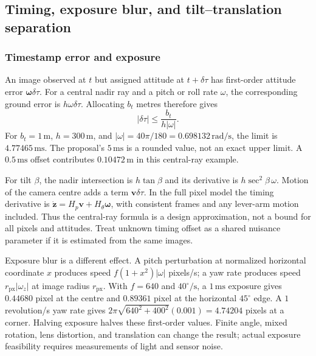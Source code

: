 \subsection{Timing, exposure blur, and tilt--translation separation}

\subsubsection{Timestamp error and exposure}

An image observed at $t$ but assigned attitude at $t+\delta\tau$ has
first-order attitude error $\boldsymbol\omega\delta\tau$. For a central
nadir ray and a pitch or roll rate $\omega$, the corresponding ground
error is $h\omega\delta\tau$. Allocating $b_t$ metres therefore gives
\begin{equation}
 |\delta\tau|\leq\frac{b_t}{h|\omega|}.
\end{equation}
For $b_t=1\,\mathrm m$, $h=300\,\mathrm m$, and
$|\omega|=40\pi/180=0.698132\,\mathrm{rad/s}$, the limit is
$4.77465\,\mathrm{ms}$. The proposal's $5\,\mathrm{ms}$ is a rounded
value, not an exact upper limit. A $0.5\,\mathrm{ms}$ offset contributes
$0.10472\,\mathrm m$ in this central-ray example.

For tilt $\beta$, the nadir intersection is $h\tan\beta$ and its derivative
is $h\sec^2\beta\,\omega$. Motion of the camera centre adds a term
$\boldsymbol v\delta\tau$. In the full pixel model the timing derivative
is $\dot{\boldsymbol z}=H_p\boldsymbol v+H_\theta\boldsymbol\omega$,
with consistent frames and any lever-arm motion included. Thus the
central-ray formula is a design approximation, not a bound for all
pixels and attitudes. Treat unknown timing offset as a shared nuisance
parameter if it is estimated from the same images.

Exposure blur is a different effect. A pitch perturbation at normalized
horizontal coordinate $x$ produces speed
$f(1+x^2)|\omega|$ pixels/s; a yaw rate produces speed
$r_{\mathrm{px}}|\omega_z|$ at image radius $r_{\mathrm{px}}$.
With $f=640$ and $40^\circ/\mathrm s$, a $1\,\mathrm{ms}$ exposure gives
$0.44680$ pixel at the centre and $0.89361$ pixel at the horizontal
$45^\circ$ edge. A $1$ revolution/s yaw rate gives
$2\pi\sqrt{640^2+400^2}(0.001)=4.74204$ pixels at a corner.
Halving exposure halves these first-order values. Finite angle, mixed
rotation, lens distortion, and translation can change the result; actual
exposure feasibility requires measurements of light and sensor noise.

